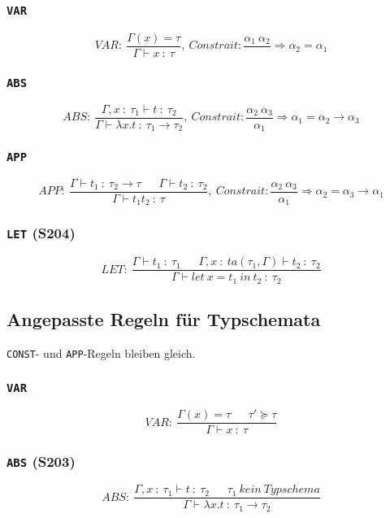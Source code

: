 \subsubsection{\texttt{VAR}}
\[VAR:~\frac{\Gamma(x)=\tau}{\Gamma \vdash x~:~\tau},~Constrait: \frac{\alpha_1~\alpha_2}{} \Rightarrow \alpha_2 = \alpha_1\]

\subsubsection{\texttt{ABS}}
\[ABS:~\frac{\Gamma,x~:~\tau_1 \vdash t~:~\tau_2}{\Gamma \vdash \lambda x.t~:~\tau_1 \rightarrow \tau_2},~Constrait: \frac{\alpha_2~\alpha_3}{\alpha_1} \Rightarrow \alpha_1 = \alpha_2 \rightarrow \alpha_3\]

\subsubsection{\texttt{APP}}
\[APP:~\frac{\Gamma \vdash t_1~:~\tau_2 \rightarrow \tau~~~~~~~\Gamma\vdash t_2~:~\tau_2}{\Gamma\vdash t_1t_2~:~\tau},~Constrait: \frac{\alpha_2~\alpha_3}{\alpha_1} \Rightarrow \alpha_2 = \alpha_3 \rightarrow \alpha_1\]

\subsubsection{\texttt{LET} (S204)}
\[LET:~\frac{\Gamma \vdash t_1~:~\tau_1~~~~~~~\Gamma,x~:~ta(\tau_1,\Gamma)\vdash t_2~:~\tau_2}{\Gamma \vdash let~x=t_1~in~t_2~:~\tau_2}\]


\subsection{Angepasste Regeln für Typschemata}
\texttt{CONST}- und \texttt{APP}-Regeln bleiben gleich.

\subsubsection{\texttt{VAR}}
\[VAR:~\frac{\Gamma(x)=\tau~~~~~~~\tau'\succeq\tau}{\Gamma \vdash x~:~\tau}\]

\subsubsection{\texttt{ABS} (S203)}
\[ABS:~\frac{\Gamma,x~:~\tau_1 \vdash t~:~\tau_2~~~~~~~\tau_1~kein~Typschema}{\Gamma \vdash \lambda x.t~:~\tau_1 \rightarrow \tau_2}\]



